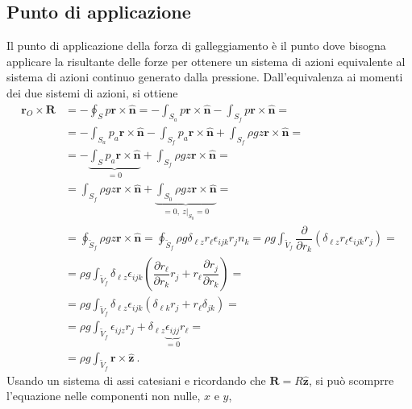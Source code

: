 \subsection{Punto di applicazione}
Il punto di applicazione della forza di galleggiamento è il punto dove bisogna applicare la risultante delle forze per ottenere un sistema di azioni equivalente al sistema di azioni continuo generato dalla pressione.
Dall'equivalenza ai momenti dei due sistemi di azioni, si ottiene
\begin{equation}
\begin{aligned}
\bm{r}_O \times \bm{R} & = - \oint_{S} p \bm{r} \times \bm{\hat{n}} = 
    - \int_{S_a} p \bm{r} \times \bm{\hat{n}}
    - \int_{S_f} p \bm{r} \times \bm{\hat{n}} = \\
& = - \int_{S_a} p_a \bm{r} \times \bm{\hat{n}}
    - \int_{S_f} p_a \bm{r} \times \bm{\hat{n}} 
    + \int_{S_f} \rho g z \bm{r} \times \bm{\hat{n}} = \\
& = - \underbrace{\int_{S} p_a \bm{r} \times \bm{\hat{n}}}_{=0} + 
      \int_{S_f} \rho g z \bm{r} \times \bm{\hat{n}} = \\
& =   \int_{S_f} \rho g z \bm{r} \times \bm{\hat{n}} + 
      \underbrace{\int_{S_0} \rho g z \bm{r} \times \bm{\hat{n}}}_{=0, \ z|_{S_0} = 0} =\\
& =  \oint_{\tilde{S}_f} \rho g z \bm{r} \times \bm{\hat{n}} = 
     \oint_{\tilde{S}_f} \rho g \delta_{\ell z} r_{\ell} \epsilon_{ijk} r_j n_k = 
     \rho g \int_{\tilde{V}_f} \dfrac{\partial}{\partial r_k}( \delta_{\ell z} r_{\ell} \epsilon_{ijk} r_j ) = \\
    & = \rho g \int_{\tilde{V}_f} \delta_{\ell z} \epsilon_{ijk}\left(  \dfrac{\partial r_{\ell}}{\partial r_k} r_j + r_{\ell} \dfrac{\partial r_j}{\partial r_k} \right) = \\ 
    & = \rho g \int_{\tilde{V}_f} \delta_{\ell z} \epsilon_{ijk}\left( \delta_{\ell k}r_j + r_{\ell} \delta_{jk} \right) = \\
    & = \rho g \int_{\tilde{V}_f} \epsilon_{ijz} r_j + \delta_{\ell z} \underbrace{\epsilon_{ijj}}_{ = 0} r_{\ell} = \\
    & = \rho g \int_{\tilde{V}_f}  \bm{r} \times \bm{\hat{z}} \ .
\end{aligned}
\end{equation}
Usando un sistema di assi catesiani e ricordando che $\bm{R} = R \bm{\hat{z}}$, si può scomprre l'equazione nelle componenti non nulle, $x$ e $y$, 
